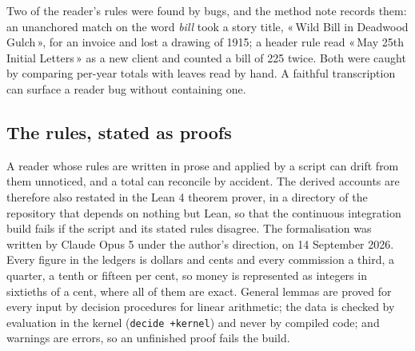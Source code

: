 \documentclass[11pt]{article}
\newcommand{\q}[1]{«\,#1\,»}
\begin{document}
Two of the reader's rules were found by bugs, and the method note records them: an unanchored match on the word \emph{bill} took a story title, \q{Wild Bill in Deadwood Gulch}, for an invoice and lost a drawing of 1915; a header rule read \q{May 25th Initial Letters} as a new client and counted a bill of 225 twice. Both were caught by comparing per-year totals with leaves read by hand. A faithful transcription can surface a reader bug without containing one.

\subsection{The rules, stated as proofs}

A reader whose rules are written in prose and applied by a script can drift from them unnoticed, and a total can reconcile by accident. The derived accounts are therefore also restated in the Lean 4 theorem prover, in a directory of the repository that depends on nothing but Lean, so that the continuous integration build fails if the script and its stated rules disagree. The formalisation was written by Claude Opus 5 under the author's direction, on 14 September 2026. Every figure in the ledgers is dollars and cents and every commission a third, a quarter, a tenth or fifteen per cent, so money is represented as integers in sixtieths of a cent, where all of them are exact. General lemmas are proved for every input by decision procedures for linear arithmetic; the data is checked by evaluation in the kernel (\texttt{decide +kernel}) and never by compiled code; and warnings are errors, so an unfinished proof fails the build.
\end{document}
